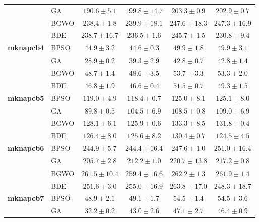 \documentclass[journal,article,submit,moreauthors]{Definitions/mdpi}
\begin{document}
\begin{table}[htbp]
\begin{tabular*}{\textwidth}{@{\extracolsep{\fill}}llcccc@{}}
                       & GA    & $\mathbf{190.6 \pm 5.1}$ & $199.8 \pm 14.7$ & $203.3 \pm 0.9$ & $202.9 \pm 0.7$ \\
                       & BGWO  & $\mathbf{238.4 \pm 1.8}$ & $239.9 \pm 18.1$ & $247.6 \pm 18.3$ & $247.3 \pm 16.9$ \\
                       & BDE   & $238.7 \pm 16.7$ & $236.5 \pm 1.6$ & $245.7 \pm 1.5$ & $\mathbf{230.8 \pm 9.4}$ \\
    \midrule
    \textbf{mknapcb4}  & BPSO  & $44.9 \pm 3.2$ & $\mathbf{44.6 \pm 0.3}$ & $49.9 \pm 1.8$ & $49.9 \pm 3.1$ \\
                       & GA    & $\mathbf{28.9 \pm 0.2}$ & $39.3 \pm 2.9$ & $42.8 \pm 0.7$ & $42.8 \pm 1.4$ \\
                       & BGWO  & $48.7 \pm 1.4$ & $\mathbf{48.6 \pm 3.5}$ & $53.7 \pm 3.3$ & $53.3 \pm 2.0$ \\
                       & BDE   & $46.8 \pm 1.9$ & $\mathbf{46.6 \pm 0.4}$ & $51.5 \pm 0.7$ & $49.3 \pm 1.5$ \\
    \midrule
    \textbf{mknapcb5}  & BPSO  & $119.0 \pm 4.9$ & $\mathbf{118.4 \pm 0.7}$ & $125.0 \pm 8.1$ & $125.1 \pm 8.0$ \\
                       & GA    & $\mathbf{89.8 \pm 0.5}$ & $104.5 \pm 6.9$ & $108.5 \pm 0.8$ & $109.0 \pm 6.9$ \\
                       & BGWO  & $128.1 \pm 6.1$ & $\mathbf{125.9 \pm 0.6}$ & $133.3 \pm 8.5$ & $131.8 \pm 0.4$ \\
                       & BDE   & $126.4 \pm 8.0$ & $125.6 \pm 8.2$ & $130.4 \pm 0.7$ & $\mathbf{124.5 \pm 4.5}$ \\
    \midrule
    \textbf{mknapcb6}  & BPSO  & $244.9 \pm 5.7$ & $\mathbf{244.4 \pm 16.4}$ & $247.6 \pm 1.0$ & $251.0 \pm 16.4$ \\
                       & GA    & $\mathbf{205.7 \pm 2.8}$ & $212.2 \pm 1.0$ & $220.7 \pm 13.8$ & $217.2 \pm 0.8$ \\
                       & BGWO  & $261.5 \pm 10.4$ & $\mathbf{259.4 \pm 16.6}$ & $262.2 \pm 1.3$ & $261.9 \pm 1.4$ \\
                       & BDE   & $251.6 \pm 3.0$ & $255.0 \pm 16.9$ & $263.8 \pm 17.0$ & $\mathbf{248.3 \pm 18.7}$ \\
    \midrule
    \textbf{mknapcb7}  & BPSO  & $\mathbf{48.9 \pm 2.1}$ & $49.1 \pm 1.7$ & $54.5 \pm 1.4$ & $54.5 \pm 3.6$ \\
                       & GA    & $\mathbf{32.2 \pm 0.2}$ & $43.0 \pm 2.6$ & $47.1 \pm 2.7$ & $46.4 \pm 0.9$ \\

\end{tabular*}
\end{table}
\end{document}
